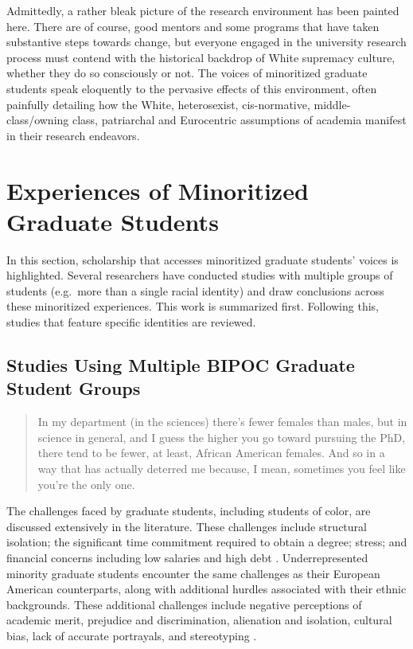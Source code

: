 \documentclass[
  11pt,
]{book}
\begin{document}
Admittedly, a rather bleak picture of the research environment has been painted here. There are of course, good mentors and some programs that have taken substantive steps towards change, but everyone engaged in the university research process must contend with the historical backdrop of White supremacy culture, whether they do so consciously or not. The voices of minoritized graduate students speak eloquently to the pervasive effects of this environment, often painfully detailing how the White, heterosexist, cis-normative, middle-class/owning class, patriarchal and Eurocentric assumptions of academia manifest in their research endeavors.

\section{Experiences of Minoritized Graduate Students}\label{experiences-of-minoritized-graduate-students}

In this section, scholarship that accesses minoritized graduate students' voices is highlighted. Several researchers have conducted studies with multiple groups of students (e.g.~more than a single racial identity) and draw conclusions across these minoritized experiences. This work is summarized first. Following this, studies that feature specific identities are reviewed.

\subsection{Studies Using Multiple BIPOC Graduate Student Groups}\label{studies-using-multiple-bipoc-graduate-student-groups}

\begin{quote}
In my department (in the sciences) there's fewer females than males, but in science in general, and I guess the higher you go toward pursuing the PhD, there tend to be fewer, at least, African American females. And so in a way that has actually deterred me because, I mean, sometimes you feel like you're the only one. \citep[238]{levin_graduate_2013}
\end{quote}

The challenges faced by graduate students, including students of color, are discussed extensively in the literature. These challenges include structural isolation; the significant time commitment required to obtain a degree; stress; and financial concerns including low salaries and high debt \citep{maton_experiences_2011}. Underrepresented minority graduate students encounter the same challenges as their European American counterparts, along with additional hurdles associated with their ethnic backgrounds. These additional challenges include negative perceptions of academic merit, prejudice and discrimination, alienation and isolation, cultural bias, lack of accurate portrayals, and stereotyping \citep{curry_systematized_2020, maton_experiences_2011}.
\end{document}
